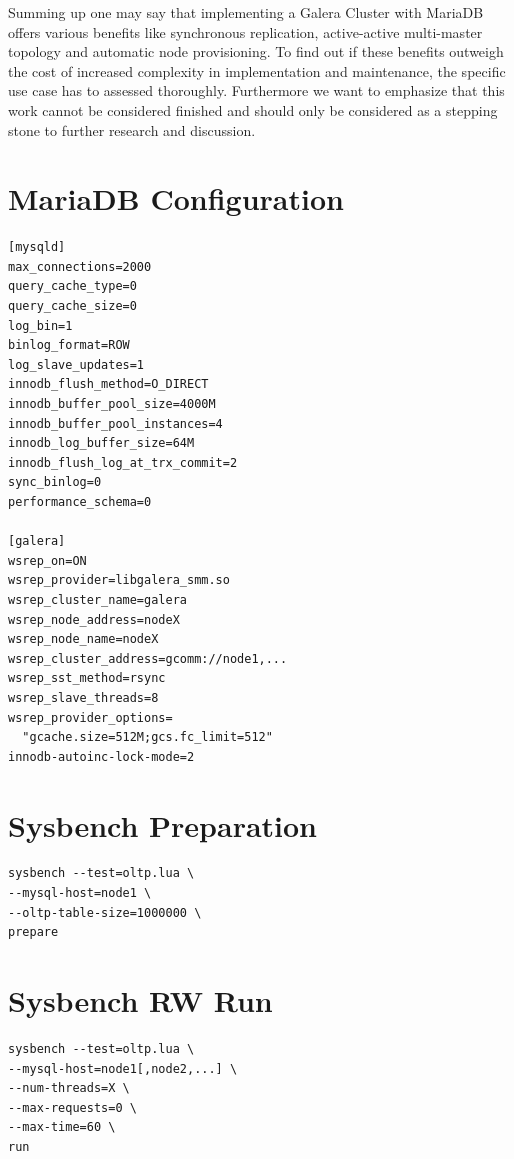 \documentclass{sig-alternate}
\begin{document}
Summing up one may say that implementing a Galera Cluster with MariaDB offers various benefits like synchronous replication, active-active multi-master topology and automatic node provisioning. To find out if these benefits outweigh the cost of increased complexity in implementation and maintenance, the specific use case has to assessed thoroughly. Furthermore we want to emphasize that this work cannot be considered finished and should only be considered as a stepping stone to further research and discussion.

\sloppy
\printbibliography

\appendix
\section{MariaDB Configuration}
\begin{verbatim}
[mysqld]
max_connections=2000
query_cache_type=0
query_cache_size=0
log_bin=1
binlog_format=ROW
log_slave_updates=1
innodb_flush_method=O_DIRECT
innodb_buffer_pool_size=4000M
innodb_buffer_pool_instances=4
innodb_log_buffer_size=64M
innodb_flush_log_at_trx_commit=2
sync_binlog=0
performance_schema=0

[galera]
wsrep_on=ON
wsrep_provider=libgalera_smm.so
wsrep_cluster_name=galera
wsrep_node_address=nodeX
wsrep_node_name=nodeX
wsrep_cluster_address=gcomm://node1,...
wsrep_sst_method=rsync
wsrep_slave_threads=8
wsrep_provider_options=
  "gcache.size=512M;gcs.fc_limit=512"
innodb-autoinc-lock-mode=2
\end{verbatim}

\section{Sysbench Preparation}
\begin{verbatim}
sysbench --test=oltp.lua \
--mysql-host=node1 \
--oltp-table-size=1000000 \
prepare
\end{verbatim}

\section{Sysbench RW Run}
\begin{verbatim}
sysbench --test=oltp.lua \
--mysql-host=node1[,node2,...] \
--num-threads=X \
--max-requests=0 \
--max-time=60 \
run
\end{verbatim}
\end{document}
